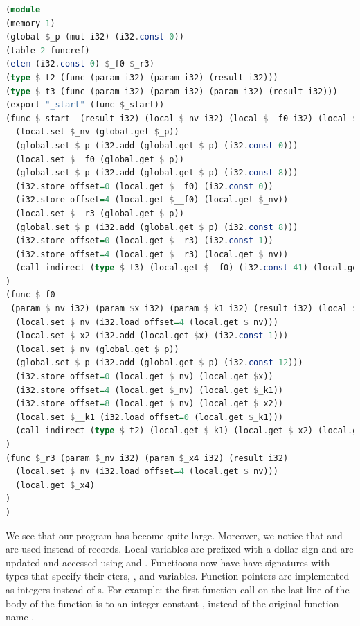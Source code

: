 {\begin{lstlisting}[language=Haskell]
(module
(memory 1)
(global $_p (mut i32) (i32.const 0))
(table 2 funcref)
(elem (i32.const 0) $_f0 $_r3)
(type $_t2 (func (param i32) (param i32) (result i32)))
(type $_t3 (func (param i32) (param i32) (param i32) (result i32)))
(export "_start" (func $_start))
(func $_start  (result i32) (local $_nv i32) (local $__f0 i32) (local $__r3 i32)
  (local.set $_nv (global.get $_p))
  (global.set $_p (i32.add (global.get $_p) (i32.const 0)))
  (local.set $__f0 (global.get $_p))
  (global.set $_p (i32.add (global.get $_p) (i32.const 8)))
  (i32.store offset=0 (local.get $__f0) (i32.const 0))
  (i32.store offset=4 (local.get $__f0) (local.get $_nv))
  (local.set $__r3 (global.get $_p))
  (global.set $_p (i32.add (global.get $_p) (i32.const 8)))
  (i32.store offset=0 (local.get $__r3) (i32.const 1))
  (i32.store offset=4 (local.get $__r3) (local.get $_nv))
  (call_indirect (type $_t3) (local.get $__f0) (i32.const 41) (local.get $__r3) (i32.const 0))
)
(func $_f0
 (param $_nv i32) (param $x i32) (param $_k1 i32) (result i32) (local $_x2 i32) (local $__k1 i32)
  (local.set $_nv (i32.load offset=4 (local.get $_nv)))
  (local.set $_x2 (i32.add (local.get $x) (i32.const 1)))
  (local.set $_nv (global.get $_p))
  (global.set $_p (i32.add (global.get $_p) (i32.const 12)))
  (i32.store offset=0 (local.get $_nv) (local.get $x))
  (i32.store offset=4 (local.get $_nv) (local.get $_k1))
  (i32.store offset=8 (local.get $_nv) (local.get $_x2))
  (local.set $__k1 (i32.load offset=0 (local.get $_k1)))
  (call_indirect (type $_t2) (local.get $_k1) (local.get $_x2) (local.get $__k1))
)
(func $_r3 (param $_nv i32) (param $_x4 i32) (result i32) 
  (local.set $_nv (i32.load offset=4 (local.get $_nv)))
  (local.get $_x4)
)
)
\end{lstlisting}

We see that our program has become quite large. Moreover, we notice that  and  are used instead of records. Local variables are prefixed with a dollar sign \icode{$} and are updated and accessed using  and . Functioons now have have signatures with types that specify their eters, , and  variables. Function pointers are implemented as integers instead of s. For example: the first function call on the last line of the body of the  function is to an integer constant , instead of the original function name . 

}
